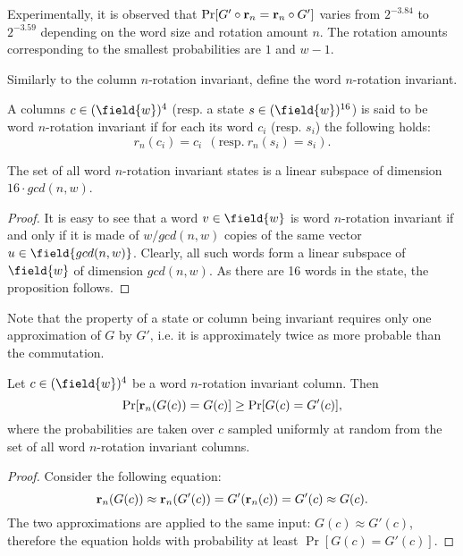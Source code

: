 \begin{observation}
Experimentally, it is observed that $\Pr[G' \circ \mathbf{r}_n = \mathbf{r}_n \circ G']$ varies from $2^{-3.84}$ to $2^{-3.59}$ depending on the word size and rotation amount $n$. The rotation amounts corresponding to the smallest probabilities are $1$ and $w-1$.
\end{observation}

Similarly to the column $n$-rotation invariant, define the word $n$-rotation invariant.

\begin{definition}
A columns $c \in (\field{w})^4$ (resp. a state $s \in (\field{w})^{16}$) is said to be word $n$-rotation invariant if for each its word $c_i$ (resp. $s_i$) the following holds:
$$
r_n(c_i) = c_i~~(\text{resp.}~r_n(s_i) = s_i).
$$
\end{definition}

\begin{proposition}
The set of all word $n$-rotation invariant states is a linear subspace of dimension $16\cdot gcd(n, w)$.
\end{proposition}
\begin{proof}
It is easy to see that a word $v \in \field{w}$ is word $n$-rotation invariant if and only if it is made of $w/gcd(n,w)$ copies of the same vector $u \in \field{gcd(n,w)}$. Clearly, all such words form a linear subspace of $\field{w}$ of dimension $gcd(n,w)$. As there are 16 words in the state, the proposition follows.
\end{proof}

Note that the property of a state or column being invariant requires only one approximation of $G$ by $G'$, i.e. it is approximately twice as more probable than the commutation. 

\begin{proposition}
Let $c \in (\field{w})^4$ be a word $n$-rotation invariant column. Then 
$$
\Pr[\mathbf{r}_n(G(c)) = G(c)] \ge \Pr[G(c) = G'(c)],
$$
where the probabilities are taken over $c$ sampled uniformly at random from the set of all word $n$-rotation invariant columns.
\end{proposition}
\begin{proof}
Consider the following equation:
$$
\mathbf{r}_n(G(c)) \approx \mathbf{r}_n(G'(c)) = G'(\mathbf{r}_n(c)) = G'(c) \approx G(c).
$$
The two approximations are applied to the same input: $G(c) \approx G'(c)$, therefore the equation holds with probability at least $\Pr[G(c) = G'(c)]$.
\end{proof}

